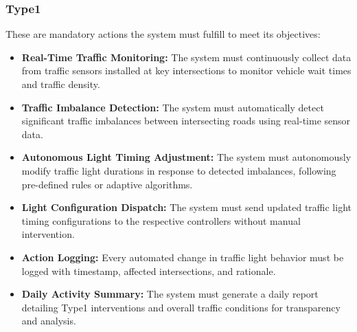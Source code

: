 \documentclass[a4paper,12pt]{article}
\begin{document}
\subsubsection*{Type1}
These are mandatory actions the system must fulfill to meet its objectives:
\begin{itemize}
    \item \textbf{Real-Time Traffic Monitoring:}  
    The system must continuously collect data from traffic sensors installed at key intersections to monitor vehicle wait times and traffic density.

    \item \textbf{Traffic Imbalance Detection:}  
    The system must automatically detect significant traffic imbalances between intersecting roads using real-time sensor data.

    \item \textbf{Autonomous Light Timing Adjustment:}  
    The system must autonomously modify traffic light durations in response to detected imbalances, following pre-defined rules or adaptive algorithms.

    \item \textbf{Light Configuration Dispatch:}  
    The system must send updated traffic light timing configurations to the respective controllers without manual intervention.

    \item \textbf{Action Logging:}  
    Every automated change in traffic light behavior must be logged with timestamp, affected intersections, and rationale.

    \item \textbf{Daily Activity Summary:}  
    The system must generate a daily report detailing Type1 interventions and overall traffic conditions for transparency and analysis.
\end{itemize}
\end{document}
